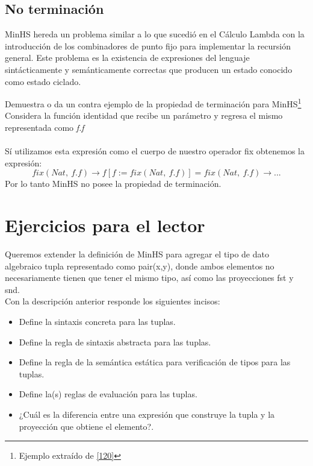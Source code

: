     \subsection{No terminación}
        \textsf{MinHS} hereda un problema similar a lo que sucedió en el Cálculo Lambda con la introducción de los combinadores de punto fijo para implementar la recursión general. Este problema es la existencia de expresiones del lenguaje sintácticamente y semánticamente correctas que producen un estado conocido como estado ciclado.

        \begin{exercise}
            Demuestra o da un contra ejemplo de la propiedad de terminación para \textsf{MinHS}\footnote{Ejemplo extraído de \hyperlink{120}{[120]}}\\

            Considera la función identidad que recibe un parámetro y regresa el mismo representada como \textit{f.f} \\\\
	 Sí utilizamos esta expresión como el cuerpo de nuestro operador \textsf{fix} obtenemos la expresión:
            \[
                \textit{fix}(Nat,\ f.f) \to f[f:=fix(Nat,\ f.f)] = fix(Nat,\ f.f)  \to ...
            \]
            Por lo tanto \textsf{MinHS} no posee la propiedad de terminación.
        \end{exercise}


\section{Ejercicios para el lector}

    \begin{exercise}
        Queremos extender la definición de \textsf{MinHS} para agregar el tipo de dato algebraico tupla representado como \textsf{pair(x,y)}, donde ambos elementos no necesariamente tienen que tener el mismo tipo, así como las proyecciones \textsf{fst} y \textsf{snd}.\\

        Con  la descripción anterior responde los siguientes incisos:\\
        \begin{itemize}
            \item Define la sintaxis concreta para las tuplas.
            \item Define la regla de sintaxis abstracta para las tuplas.
            \item Define la regla de la semántica estática para verificación de tipos para las tuplas.
            \item Define la(s) reglas de evaluación para las tuplas.
            \item ¿Cuál es la diferencia entre una expresión que construye la tupla y la proyección que obtiene el elemento?.
        \end{itemize}
    \end{exercise}


